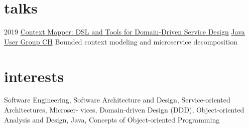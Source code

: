\documentclass[]{cv-style}
\begin{document}

\section{talks}

\begin{entrylist}
\entry
{2019}
{\href{https://www.jug.ch/html/events/2019/context_mapper.html}{Context Mapper: DSL and Tools for Domain-Driven Service Design}}
{\href{https://www.jug.ch/}{Java User Group CH}}
{Bounded context modeling and microservice decomposition}
\end{entrylist}





\section{interests}
  \vspace{-0.2cm}

Software Engineering, Software Architecture and Design, Service-oriented Architectures, Microser- vices, Domain-driven Design (DDD), Object-oriented Analysis and Design, Java, Concepts of Object-oriented Programming

\end{document}
